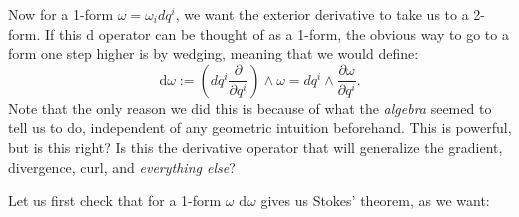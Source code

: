 	Now for a 1-form $\omega = \omega_i dq^i$, we want the exterior derivative to take us to a 2-form. If this $\mathrm d$ operator can be thought of as a 1-form, the obvious way to go to a form one step higher is by wedging, meaning that we would define:
	\begin{equation}\label{eq:exterior_derivative2}
		\mathrm d \omega := (dq^i \frac{\partial}{\partial q^i}) \wedge \omega= dq^i \wedge \frac{\partial \omega}{\partial q^i}.
	\end{equation}
	Note that the only reason we did this is because of what the \emph{algebra} seemed to tell us to do, independent of any geometric intuition beforehand. This is powerful, but is this right? Is this the derivative operator that will generalize the gradient, divergence, curl, and \emph{everything else}?
	
	Let us first check that for a 1-form $\omega$ $\mathrm d \omega$ gives us Stokes' theorem, as we want:
	
